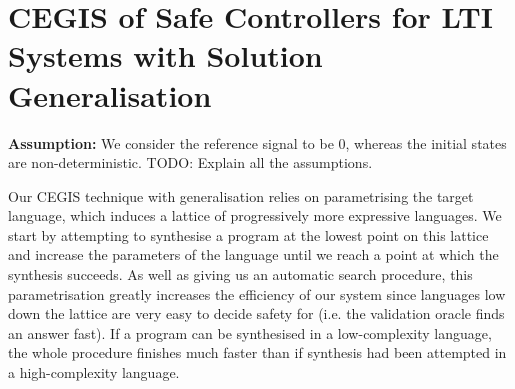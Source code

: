 \documentclass[runningheads,a4paper]{llncs}
\newcommand{\todo}[1]{{\color{red} TODO: #1}}
\begin{document}



\section{CEGIS of Safe Controllers for LTI Systems with Solution Generalisation} 
\label{sec:CEGARIS} 


{\bf Assumption:} We consider the reference signal to be 0, whereas the initial states are non-deterministic.
\todo{Explain all the assumptions.}

Our CEGIS technique with generalisation %
relies on parametrising the target language, which
induces a lattice of progressively more expressive languages.  We
start by attempting to synthesise a program at the lowest point on
this lattice and increase the parameters of the language until we
reach a point at which the synthesis succeeds. As well as giving us an
automatic search procedure, this parametrisation greatly increases the
efficiency of our system since languages low down the lattice are very
easy to decide safety for (i.e. the validation oracle finds an answer
fast). If a program can be synthesised in a low-complexity language,
the whole procedure finishes much faster than if synthesis had been
attempted in a high-complexity language.
\end{document}
